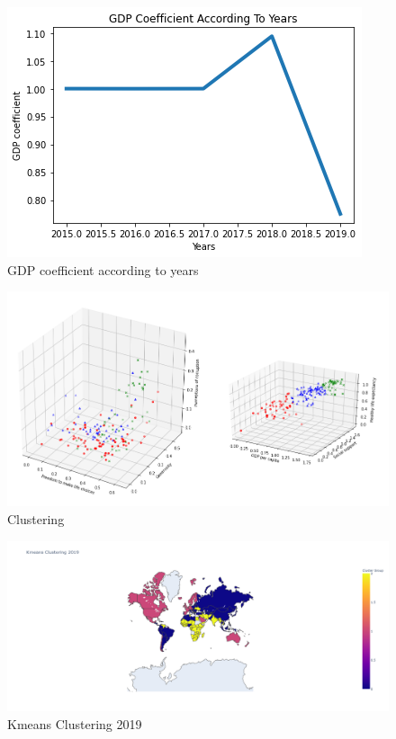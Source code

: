 \documentclass[onecolumn]{article}
\begin{document}
\begin{figure}[htp]
\centering
\includegraphics[scale=0.50]{gdp.png}
\caption{GDP coefficient according to years}
\end{figure}

\begin{figure}[htp]
\centering
\includegraphics[scale=0.50]{clustering3.png}
\caption{Clustering}
\end{figure}

\begin{figure}[htp]
\centering
\includegraphics[scale=0.30]{clusteringmap.png}
\caption{Kmeans Clustering 2019}
\end{figure}
\end{document}
